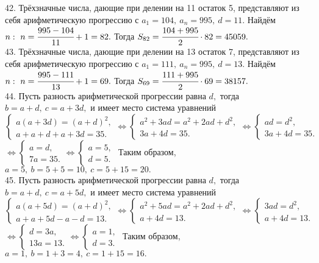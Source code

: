 42. Трёхзначные числа, дающие при делении на 11 остаток 5, представляют из себя арифметическую прогрессию с $a_1=104,\ a_n=995,\ d=11.$ Найдём $n:\ n=\cfrac{995-104}{11}+1=82.$ Тогда $S_{82}=\cfrac{104+995}{2}\cdot82=45059.$\\
43. Трёхзначные числа, дающие при делении на 13 остаток 7, представляют из себя арифметическую прогрессию с $a_1=111,\ a_n=995,\ d=13.$ Найдём $n:\ n=\cfrac{995-111}{13}+1=69.$ Тогда $S_{69}=\cfrac{111+995}{2}\cdot69=38157.$\\
44. Пусть разность арифметической прогрессии равна $d,$ тогда $b=a+d,\ c=a+3d,$ и имеет место система уравнений
$\begin{cases} a(a+3d)=(a+d)^2,\\ a+a+d+a+3d=35.\end{cases}\Leftrightarrow\begin{cases} a^2+3ad=a^2+2ad+d^2,\\ 3a+4d=35.\end{cases}\Leftrightarrow
\begin{cases} ad=d^2,\\ 3a+4d=35.\end{cases}$\\$\Leftrightarrow\begin{cases} a=d,\\ 7a=35.\end{cases}
\Leftrightarrow\begin{cases} a=5,\\ d=5.\end{cases}$ Таким образом, $a=5,\ b=5+5=10,\ c=5+15=20.$\\
45. Пусть разность арифметической прогрессии равна $d,$ тогда $b=a+d,\ c=a+5d,$ и имеет место система уравнений
$\begin{cases} a(a+5d)=(a+d)^2,\\ a+a+5d-a-d=13.\end{cases}\Leftrightarrow\begin{cases} a^2+5ad=a^2+2ad+d^2,\\ a+4d=13.\end{cases}\Leftrightarrow
\begin{cases} 3ad=d^2,\\ a+4d=13.\end{cases}$\\$\Leftrightarrow\begin{cases} d=3a,\\ 13a=13.\end{cases}
\Leftrightarrow\begin{cases} a=1,\\ d=3.\end{cases}$ Таким образом, $a=1,\ b=1+3=4,\ c=1+15=16.$\\
